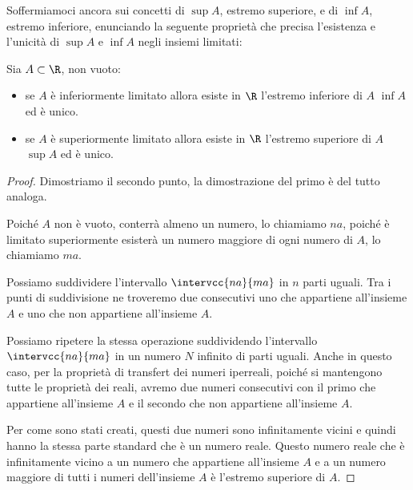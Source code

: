 Soffermiamoci ancora sui concetti di \(\sup{A}\), estremo superiore, e 
di \(\inf{A}\), 
estremo inferiore, enunciando la seguente proprietà che precisa l'esistenza 
e l'unicità di \(\sup{A}\) e \(\inf{A}\) negli insiemi limitati:
\begin{newtheo}
Sia \(A\subset\R\), non vuoto:
\begin{itemize} [nosep]
\item se \(A\) è inferiormente limitato allora esiste in \(\R\) 
l'estremo inferiore di \(A\) \(\inf{A}\) ed è unico.
\item se \(A\) è superiormente limitato allora esiste in \(\R\) 
l'estremo superiore di \(A\) \(\sup{A}\) ed è unico.
\end{itemize}
\end{newtheo}
\begin{proof}
Dimostriamo il secondo punto, la dimostrazione del primo è del tutto 
analoga.

Poiché \(A\) non è vuoto, conterrà almeno un numero, lo chiamiamo \(na\), 
poiché è limitato superiormente esisterà un numero maggiore di ogni numero 
di \(A\), lo chiamiamo \(ma\).

Possiamo suddividere l'intervallo \(\intervcc{na}{ma}\) in \(n\) parti 
uguali.
Tra i punti di suddivisione ne troveremo due consecutivi uno che appartiene 
all'insieme \(A\) e uno che non appartiene all'insieme \(A\).

Possiamo  ripetere la stessa operazione suddividendo l'intervallo 
\(\intervcc{na}{ma}\) in un numero \(N\) infinito di parti uguali.
Anche in questo caso, per la proprietà di transfert dei numeri iperreali, 
poiché si mantengono tutte le proprietà dei reali, avremo due numeri 
consecutivi con il primo che appartiene all'insieme \(A\) e il secondo che 
non appartiene all'insieme \(A\).

Per come sono stati creati, questi due numeri sono infinitamente vicini e 
quindi hanno la stessa parte standard che è un numero reale.
Questo numero reale che è infinitamente vicino a un numero che appartiene 
all'insieme \(A\) e a un numero maggiore di tutti i numeri dell'insieme 
\(A\) è l'estremo superiore di \(A\).
\end{proof}


